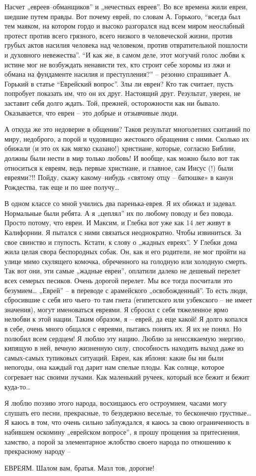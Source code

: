 Насчет „евреев–обманщиков” и „нечестных евреев”. Во все времена жили евреи,
шедшие путем правды. Вот почему еврей, по словам А. Горького, “всегда был тем
маяком, на котором гордо и высоко разгорался над всем миром неослабный протест
против всего грязного, всего низкого в человеческой жизни, против грубых актов
насилия человека над человеком, против отвратительной пошлости и духовного
невежества”. “И как же, в самом деле, этот могучий голос любви к истине мог не
возбуждать ненависти тех, кто строит себе хоромы из лжи и обмана на фундаменте
насилия и преступления?” – резонно спрашивает А. Горький в статье “Еврейский
вопрос”. Злы ли евреи? Кто так считает, пусть попробует показать им, что он их
друг. Настоящий друг. Результат, уверен, не заставит себя долго ждать. Той,
прежней, осторожности как ни бывало. Оказывается, что евреи – это добрые и
отзывчивые люди. 

А откуда же это недоверие в общении? Таков результат многолетних скитаний по
миру, недоброго, а порой и чудовищно жестокого обращения с ними. Сколько их
обижали (и это ох как мягко сказано!) христиане, которые, согласно Библии,
должны были нести в мир только любовь! И вообще, как можно было вот так
относиться к евреям, ведь первые христиане, и главное, сам Иисус (!) были
евреями?!! Пойду, скажу какому–нибудь «святому отцу – батюшке» в канун
Рождества, так еще и по шее получу… 

В одном классе со мной учились два паренька-еврея. Я их обижал и задевал.
Нормальные были ребята. А я „цеплял” их по любому поводу и без повода. Просто
потому, что евреи. И Максим, и Глебка вот уже как 14 лет живут в Калифорнии. Я
пытался с ними связаться неоднократно. Чтобы извиниться. За свое свинство и
глупость. Кстати, к слову о „жадных евреях”. У Глебки дома жила целая свора
беспородных собак. Он, как и его родители, не мог пройти на улице мимо
скулящего комочка, обреченного на голодную или холодную смерть. Так вот они,
эти самые „жадные евреи”, оплатили далеко не дешевый перелет всех семерых
песиков. Очень дорогой перелет. Мы все тогда посчитали это безумием… „Еврей” –
в переводе с арамейского „освобожденный”. То есть люди, сбросившие с себя иго
чьего–то там гнета (египетского или узбекского – не имеет значения), могут
именоваться евреями. Я сбросил с себя тяжеленное ярмо нелюбви к этой нации.
Таким образом, я – еврей, да еще какой! Я долго копался в себе, очень много
общался с евреями, пытаясь понять их. Я их не понял. Но полюбил всем сердцем! Я
люблю эту нацию. Люблю за неиссякаемую энергию, кипящую в ней, вечную жизненную
силу, способность находить выход даже из самых-самых тупиковых ситуаций. Евреи,
как яблоня: какие бы ни были непогоды, она каждый год дарит нам спелые плоды.
Как солнце, которое согревает нас своими лучами. Как маленький ручеек, который
все бежит и бежит куда-то… 

Я люблю поэзию этого народа, восхищаюсь его остроумием, часами могу слушать его
песни, прекрасные, то безудержно веселые, то бесконечно грустные… Я каюсь в
том, что очень сильно заблуждался, я каюсь за свою ограниченность в набившем
оскомину „еврейском вопросе”, я прошу прощения за притеснения, хамство, а порой
за элементарное жлобство своего народа по отношению к прекрасному народу –

ЕВРЕЯМ. Шалом вам, братья. Мазл тов, дорогие!
